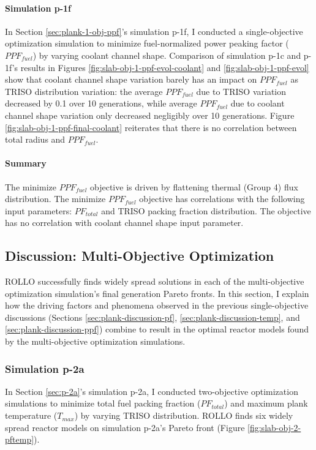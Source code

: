 \paragraph{Simulation p-1f}
In Section \ref{sec:plank-1-obj-ppf}'s simulation p-1f, I conducted a single-objective 
optimization simulation to minimize fuel-normalized power peaking factor ($PPF_{fuel}$) 
by varying coolant channel shape.
Comparison of simulation p-1c and p-1f's results in Figures 
\ref{fig:slab-obj-1-ppf-evol-coolant} and \ref{fig:slab-obj-1-ppf-evol}
show that coolant channel shape variation barely has an impact on $PPF_{fuel}$ as 
\gls{TRISO} distribution variation: the average $PPF_{fuel}$ due to \gls{TRISO} 
variation decreased by 0.1 over 10 generations, while average $PPF_{fuel}$ due to 
coolant channel shape variation only decreased negligibly over 10 generations. 
Figure \ref{fig:slab-obj-1-ppf-final-coolant} reiterates that there is no correlation 
between total radius and $PPF_{fuel}$. 

\paragraph{Summary}
The minimize $PPF_{fuel}$ objective is driven by flattening thermal (Group 4) flux 
distribution. 
The minimize $PPF_{fuel}$ objective has correlations with the following input parameters: 
$PF_{total}$ and TRISO packing fraction distribution. 
The objective has no correlation with coolant channel shape input parameter.

\subsection{Discussion: Multi-Objective Optimization}
\label{sec:plank-discussion-multi}
\gls{ROLLO} successfully finds widely spread solutions in each of the multi-objective 
optimization simulation's final generation Pareto fronts.
In this section, I explain how the driving factors and phenomena observed in 
the previous single-objective discussions (Sections 
\ref{sec:plank-discussion-pf}, \ref{sec:plank-discussion-temp}, and 
\ref{sec:plank-discussion-ppf}) combine to result in the optimal reactor models found 
by the multi-objective optimization simulations. 

\subsubsection{Simulation p-2a}
In Section \ref{sec:p-2a}'s simulation p-2a, I conducted two-objective 
optimization simulations to minimize total fuel packing fraction ($PF_{total}$) and 
maximum plank temperature ($T_{max}$) by varying TRISO distribution. 
\gls{ROLLO} finds six widely spread reactor models on simulation p-2a's Pareto 
front (Figure \ref{fig:slab-obj-2-pftemp}). 

